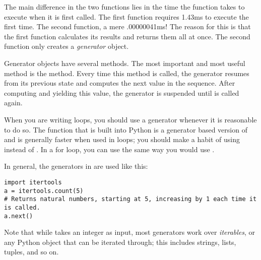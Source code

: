 The main difference in the two functions lies in the time the function takes to execute when
it is first called.  The first function requires 1.43ms to execute the first time.  The second function,
a mere .00000041ms!  The reason for this is that the first function calculates its results and returns them all at once. The second function only creates a \emph{generator} object.  

Generator objects have several methods.
The most important and most useful method is the  method.  Every time this method is called, 
the generator resumes from its previous state and computes the next value in the sequence. After computing and yielding this value, the generator is suspended until  is called again.

When you are writing  loops, you should use a generator whenever it is reasonable to do so.
The  function that is built into Python is a generator based version of  and is generally faster when used in  loops; you should make a habit of using  instead of . In a for loop, you can use  the same way you would use .

In general, the generators in  are used like this:
\begin{lstlisting}
import itertools
a = itertools.count(5) 
# Returns natural numbers, starting at 5, increasing by 1 each time it is called.
a.next()
\end{lstlisting}

Note that while  takes an integer as input, most generators work over \emph{iterables}, or any Python object that can be iterated through; this includes strings, lists, tuples, and so on.

